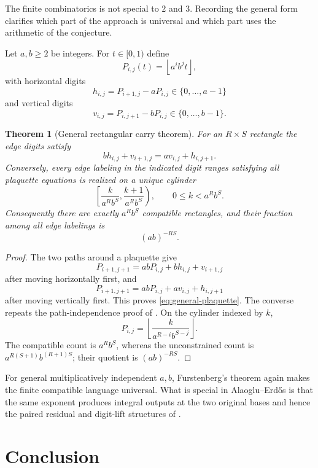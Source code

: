 \documentclass[11pt]{article}
\newtheorem{theorem}{Theorem}[section]
\theoremstyle{definition}
\theoremstyle{remark}
\newcommand{\floor}[1]{\left\lfloor#1\right\rfloor}
\begin{document}
The finite combinatorics is not special to $2$ and $3$.  Recording the general form
clarifies which part of the approach is universal and which part uses the arithmetic
of the conjecture.

Let $a,b\ge2$ be integers.  For $t\in[0,1)$ define
\[
 P_{i,j}(t)=\floor{a^ib^jt},
\]
with horizontal digits
\[
 h_{i,j}=P_{i+1,j}-aP_{i,j}\in\{0,\ldots,a-1\}
\]
and vertical digits
\[
 v_{i,j}=P_{i,j+1}-bP_{i,j}\in\{0,\ldots,b-1\}.
\]

\begin{theorem}[General rectangular carry theorem]
\label{thm:general-carry}
For an $R\times S$ rectangle the edge digits satisfy
\begin{equation}\label{eq:general-plaquette}
 b h_{i,j}+v_{i+1,j}=a v_{i,j}+h_{i,j+1}.
\end{equation}
Conversely, every edge labeling in the indicated digit ranges satisfying all
plaquette equations is realized on a unique cylinder
\[
 \left[\frac{k}{a^Rb^S},\frac{k+1}{a^Rb^S}\right),
 \qquad 0\le k<a^Rb^S.
\]
Consequently there are exactly $a^Rb^S$ compatible rectangles, and their fraction
among all edge labelings is
\begin{equation}\label{eq:general-compatibility-fraction}
 (ab)^{-RS}.
\end{equation}
\end{theorem}

\begin{proof}
The two paths around a plaquette give
\[
 P_{i+1,j+1}=abP_{i,j}+b h_{i,j}+v_{i+1,j}
\]
after moving horizontally first, and
\[
 P_{i+1,j+1}=abP_{i,j}+a v_{i,j}+h_{i,j+1}
\]
after moving vertically first.  This proves \eqref{eq:general-plaquette}.  The
converse repeats the path-independence proof of .  On the
cylinder indexed by $k$,
\[
 P_{i,j}=\floor{\frac{k}{a^{R-i}b^{S-j}}}.
\]
The compatible count is $a^Rb^S$, whereas the unconstrained count is
$a^{R(S+1)}b^{(R+1)S}$; their quotient is $(ab)^{-RS}$.
\end{proof}

For general multiplicatively independent $a,b$, Furstenberg's theorem again makes
the finite compatible language universal.  What is special in Alaoglu--Erd\H{o}s is
that the same exponent produces integral outputs at the two original bases and hence
the paired residual and digit-lift structures of
.

\section{Conclusion}
\label{sec:conclusion}
\end{document}
